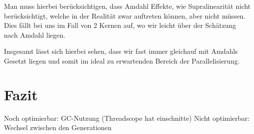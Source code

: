\documentclass[a4paper]{scrartcl}
\begin{document}
Man muss hierbei berücksichtigen, dass Amdahl Effekte, wie Supralinearität nicht berücksichtigt, welche in der Realität zwar auftreten können, aber nicht müssen. Dies fällt bei uns im Fall von 2 Kernen auf, wo wir leicht über der Schätzung nach Amdahl liegen.\par
\medskip
Insgesamt lässt sich hierbei sehen, dass wir fast immer gleichauf mit Amdahls Gesetzt liegen und somit im ideal zu erwartenden Bereich der Parallelisierung.


\section{Fazit}

Noch optimierbar: GC-Nutzung (Threadscope hat einschnitte)
Nicht optimierbar: Wechsel zwischen den Generationen

\newpage
\printbibliography[heading=bibintoc]
\end{document}
